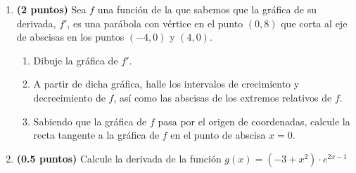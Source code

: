 
\begin{enumerate}[label=\alph*)]
  \item \textbf{(2 puntos)} Sea $f$ una función de la que sabemos que la
  gráfica de su derivada, $f'$, es una parábola con vértice en el punto $(0,8)$
  que corta al eje de abscisas en los puntos $(-4,0)$ y $(4,0)$.
  \begin{enumerate}[label=\arabic*.]
    \item Dibuje la gráfica de $f'$.
    \item A partir de dicha gráfica, halle los intervalos de crecimiento
    y decrecimiento de $f$, así como las abscisas de los extremos relativos de $f$.
    \item Sabiendo que la gráfica de $f$ pasa por el origen de coordenadas,
    calcule la recta tangente a la gráfica de $f$ en el punto de abscisa $x=0$.
  \end{enumerate}
  \item \textbf{(0.5 puntos)} Calcule la derivada de la función
  $g(x)=(-3+x^2)\cdot e^{2x-1}$
\end{enumerate}
